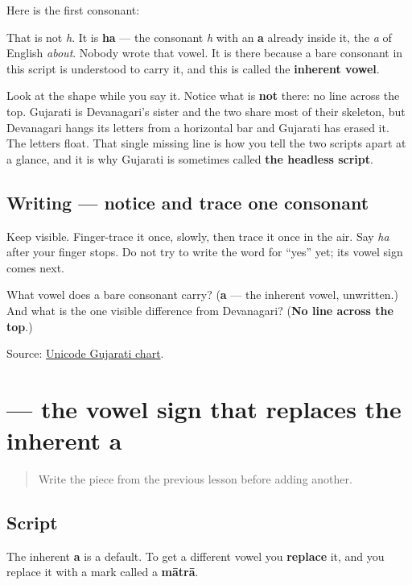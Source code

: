 Here is the first consonant:

\begin{quote}
\end{quote}

That is not \emph{h}. It is \textbf{ha} — the consonant \emph{h} with an \textbf{a} already inside it, the \emph{a} of English \emph{about}. Nobody wrote that vowel. It is there because a bare consonant in this script is understood to carry it, and this is called the \textbf{inherent vowel}.

Look at the shape while you say it. Notice what is \textbf{not} there: no line across the top. Gujarati is Devanagari's sister and the two share most of their skeleton, but Devanagari hangs its letters from a horizontal bar and Gujarati has erased it. The letters float. That single missing line is how you tell the two scripts apart at a glance, and it is why Gujarati is sometimes called \textbf{the headless script}.

\subsection*{Writing — notice and trace one consonant}
Keep \textbf{} visible. Finger-trace it once, slowly, then trace it once in the air. Say \emph{ha} after your finger stops. Do not try to write the word for \textquotedblleft{}yes\textquotedblright{} yet; its vowel sign comes next.

\begin{tcolorbox}[breakable,colback=teal!4,colframe=teal!35!black,title={Before you move on}]
What vowel does a bare consonant carry? (\textbf{a} — the inherent vowel, unwritten.) And what is the one visible difference from Devanagari? (\textbf{No line across the top}.)

Source: \href{https://www.unicode.org/charts/PDF/U0A80.pdf}{Unicode Gujarati chart}.
\end{tcolorbox}
\section[-ā]{ — the vowel sign that replaces the inherent a}

\label{lesson:GU-W01-aa-matra}



\begin{quote}
Write the piece from the previous lesson before adding another.
\end{quote}

\subsection*{Script}
The inherent \textbf{a} is a default. To get a different vowel you \textbf{replace} it, and you replace it with a mark called a \textbf{mātrā}.

